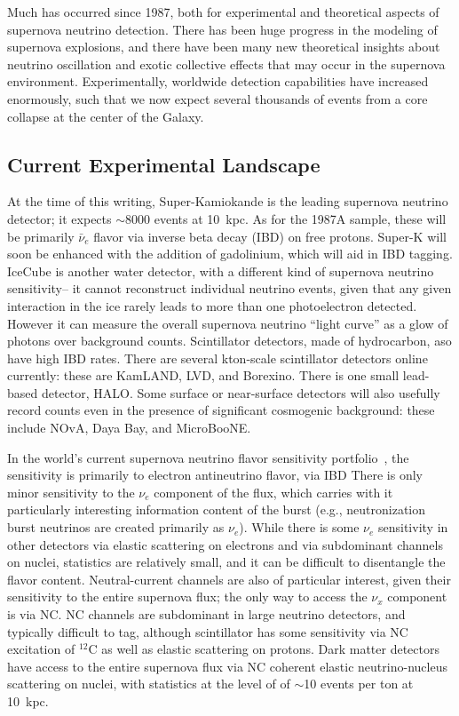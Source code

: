 Much has occurred since 1987, both for experimental and theoretical
aspects of supernova neutrino detection.
There has been huge progress in the modeling of supernova explosions,
and there have been many new theoretical insights about
neutrino oscillation and exotic collective effects that may occur in
the supernova environment.    Experimentally,
worldwide detection capabilities have increased enormously, such that
we now expect several thousands of events from a core collapse at the center
of the Galaxy.

\subsection{Current Experimental Landscape}
At the time of this writing, Super-Kamiokande is the leading supernova
neutrino detector; it expects $\sim$8000 events at 10~kpc.  As for
the 1987A sample, these will be primarily $\bar{\nu}_e$ flavor via
inverse beta decay (IBD) on free protons.  Super-K will soon be
enhanced with the addition of gadolinium, which will aid in IBD
tagging.  IceCube is another water detector, with a different kind of
supernova neutrino sensitivity-- it cannot reconstruct individual
neutrino events, given that any given interaction in the ice rarely
leads to more than one photoelectron detected.  However it can measure
the overall supernova neutrino ``light curve'' as a glow of photons
over background counts.  Scintillator detectors, made of hydrocarbon,
aso have high IBD rates.  There are several kton-scale scintillator
detectors online currently: these are KamLAND, LVD, and Borexino.
There is one small lead-based detector, HALO.  Some surface or
near-surface detectors will also usefully record counts even in the
presence of significant cosmogenic background: these include NOvA,
Daya Bay, and MicroBooNE.

In the world's current supernova neutrino flavor sensitivity
portfolio~\cite{Scholberg:2012id, Mirizzi:2015eza}, the sensitivity is primarily to electron antineutrino
flavor, via IBD There is only minor sensitivity to the $\nu_e$
component of the flux, which carries with it particularly interesting
information content of the burst (e.g., neutronization burst neutrinos
are created primarily as $\nu_e$).  While there is some $\nu_e$
sensitivity in other detectors via elastic scattering on electrons and
via subdominant channels on nuclei, statistics are relatively small,
and it can be difficult to disentangle the flavor content.
Neutral-current channels are also of particular interest, given their
sensitivity to the entire supernova flux; the only way to access the
$\nu_x$ component is via NC.  NC channels are subdominant in large
neutrino detectors, and typically difficult to tag, although
scintillator has some sensitivity via NC excitation of $^{12}$C as
well as elastic scattering on protons.  Dark matter detectors have
access to the entire supernova flux via NC coherent elastic
neutrino-nucleus scattering on nuclei, with statistics at the level of
 of $\sim$10 events per ton at 10~kpc.

